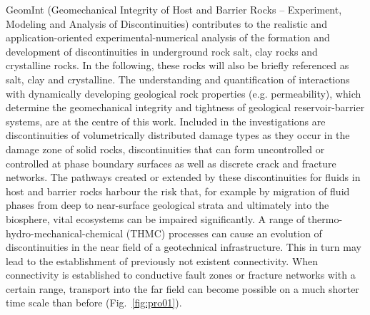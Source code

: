 GeomInt (Geomechanical Integrity of Host and Barrier Rocks -- Experiment, Modeling and Analysis of Discontinuities) contributes to the realistic and application-oriented experimental-numerical analysis of the formation and development of discontinuities in underground rock salt, clay rocks and crystalline rocks. In the following, these rocks will also be briefly referenced as salt, clay and crystalline. The understanding and quantification of interactions with dynamically developing geological rock properties (e.g. permeability), which determine the geomechanical integrity and tightness of geological reservoir-barrier systems, are at the centre of this work. Included in the investigations are discontinuities of volumetrically distributed damage types as they occur in the damage zone of solid rocks, discontinuities that can form uncontrolled or controlled at phase boundary surfaces as well as discrete crack and fracture networks. The pathways created or extended by these discontinuities for fluids in host and barrier rocks harbour the risk that, for example by migration of fluid phases from deep to near-surface geological strata and ultimately into the biosphere, vital ecosystems can be impaired significantly. A range of thermo-hydro-mechanical-chemical (THMC) processes can cause an evolution of discontinuities in the near field of a geotechnical infrastructure. This in turn may lead to the establishment of previously not existent connectivity. When connectivity is established to conductive fault zones or fracture networks with a certain range, transport into the far field can become possible on a much shorter time scale than before (Fig.~\ref{fig:pro01}).

